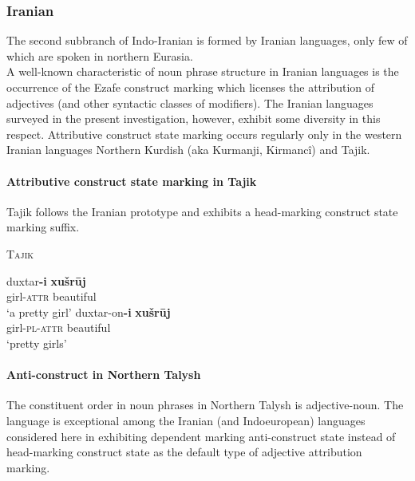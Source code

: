 \subsubsection{Iranian}\label{iranian synchr}
The second subbranch of Indo-Iranian is formed by Iranian languages, only few of which are spoken in northern Eurasia.\\

\noindent A well-known characteristic of noun phrase structure in Iranian languages is the occurrence of the Ezafe construct marking which licenses the attribution of adjectives (and other syntactic classes of modifiers). The Iranian languages surveyed in the present investigation, however, exhibit some diversity in this respect. Attributive construct state marking occurs regularly only in the western Iranian languages Northern Kurdish (aka Kurmanji, Kirmancî) and Tajik.

\paragraph{Attributive construct state marking in Tajik} Tajik follows the Iranian prototype and exhibits a head-marking construct state marking suffix.

\begin{exe}
\ex \textsc{Tajik} \citep{rastorgueva1963}
\begin{xlist}
\ex
\gll	duxtar\textbf{-i} \textbf{xušrūj}\\
	girl-\textsc{attr} beautiful\\
\glt	‘a pretty girl’
\ex
\gll	duxtar-on\textbf{-i} \textbf{xušrūj}\\
	girl-\textsc{pl}-\textsc{attr} beautiful\\
\glt	‘pretty girls’
\end{xlist}
\end{exe}

\paragraph{Anti-construct in Northern Talysh} \label{talysh synchr}
The constituent order in noun phrases in Northern Talysh is adjective-noun. The language is exceptional among the Iranian (and Indoeuropean) languages considered here in exhibiting dependent marking anti-construct state instead of head-marking construct state as the default type of adjective attribution marking.

